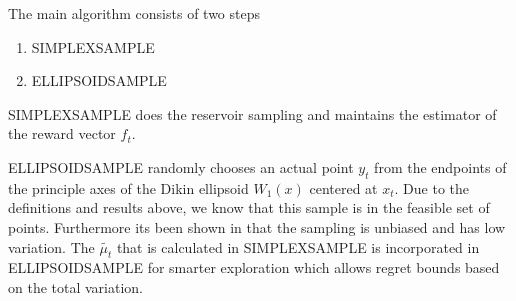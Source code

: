The main algorithm consists of two steps 
\begin{enumerate}
\item
  SIMPLEXSAMPLE
\item
  ELLIPSOIDSAMPLE
\end{enumerate}

SIMPLEXSAMPLE does the reservoir sampling and maintains the estimator of the reward vector
$f_t$. 

ELLIPSOIDSAMPLE randomly chooses an actual point $y_t$ from the endpoints of the
principle axes of the Dikin ellipsoid $W_1(x)$ centered at $x_t$. Due to the definitions and 
results above, we know that this sample is in the feasible set of points. Furthermore its been shown in \citep{abernethy} that the sampling is unbiased and has low variation.
The  $\tilde{\mu_t}$ that is calculated in SIMPLEXSAMPLE is incorporated in ELLIPSOIDSAMPLE for smarter exploration which allows regret bounds based on the total
variation.  